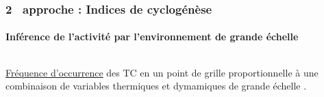 \documentclass[aspectratio=169, usepdftitle=false, xcolor={dvipsnames}, 9pt,table]{beamer}
\begin{document}
\begin{frame}[t]
    \frametitle{2\ieme~ approche : Indices de cyclogénèse}
    \framesubtitle{Inférence de l'activité par l'environnement de grande échelle}
    \begin{columns}[t]
        \begin{column}{0.5\textwidth}
            \begin{definition}
                \scriptsize
                \underline{Fréquence d'occurrence} des TC en un point de grille proportionnelle à une \mbox{combinaison} de variables \alert{thermiques} et
                \mbox{\alert{dymamiques}} de grande échelle \parencite{gray_tropical_1975}.
            \end{definition}
            \begin{columns}[t]
                \setlength{\leftmargini}{2ex}
                \begin{column}{0.45\textwidth}
                \end{column}
                \begin{column}{0.45\textwidth}
\end{column}
\end{columns}
\end{column}
\end{columns}
\end{frame}
\end{document}
